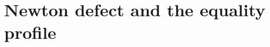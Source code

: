 \documentclass[10pt,a4paper]{amsart}
\numberwithin{equation}{section}
\begin{document}



\section{Newton defect and the equality profile}\label{sec:newton}
\end{document}
